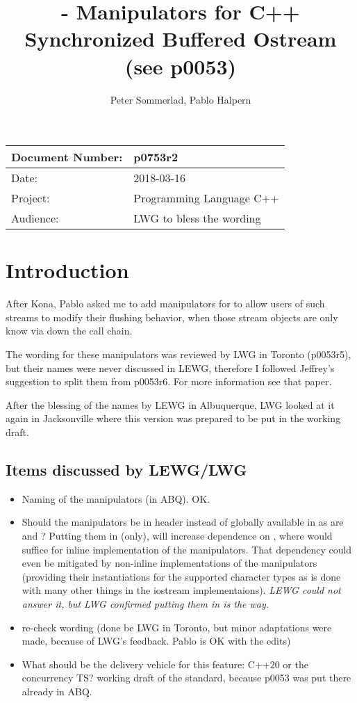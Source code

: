 \documentclass[ebook,11pt,article]{memoir}
\title{\papernumber{} - Manipulators for C++ Synchronized Buffered Ostream (see p0053)}
\author{Peter Sommerlad, Pablo Halpern}
\date{\paperdate}                %
\newcommand{\papernumber}{p0753r2}
\newcommand{\paperdate}{2018-03-16}
\begin{document}
\maketitle
\begin{center}
\begin{tabular}[t]{|l|l|}\hline 
Document Number:&  \papernumber \\\hline
Date: & \paperdate \\\hline
Project: & Programming Language C++\\\hline 
Audience: & LWG to bless the wording\\\hline
\end{tabular}
\end{center}
\chapter{Introduction}

After Kona, Pablo asked me to add  manipulators for  to allow users of such streams to modify their flushing behavior, when those stream objects are only know via  down the call chain.

The wording for these manipulators was reviewed by LWG in Toronto (p0053r5), but their names were never discussed in LEWG, therefore I followed Jeffrey's suggestion to split them from p0053r6. For more information see that paper.

After the blessing of the names by LEWG in Albuquerque, LWG looked at it again in Jacksonville where this version was prepared to be put in the working draft.

\section{Items discussed by LEWG/LWG}
\begin{itemize}
\item Naming of the manipulators (in ABQ). OK.
\item Should the manipulators be in header  instead of globally available in  as are  and ? Putting them in  (only), will increase dependence on , where  would suffice for inline implementation of the manipulators. That dependency could even be mitigated by non-inline implementations of the manipulators (providing their instantiations for the supported character types as is done with many other things in the iostream implementaions). \emph{LEWG could not answer it, but LWG confirmed putting them in  is the way.}
\item re-check wording (done be LWG in Toronto, but minor adaptations were made, because of LWG's feedback. Pablo is OK with the edits)
\item What should be the delivery vehicle for this feature: C++20 or the concurrency TS? working draft of the standard, because p0053 was put there already in ABQ.
\end{itemize}
\end{document}
